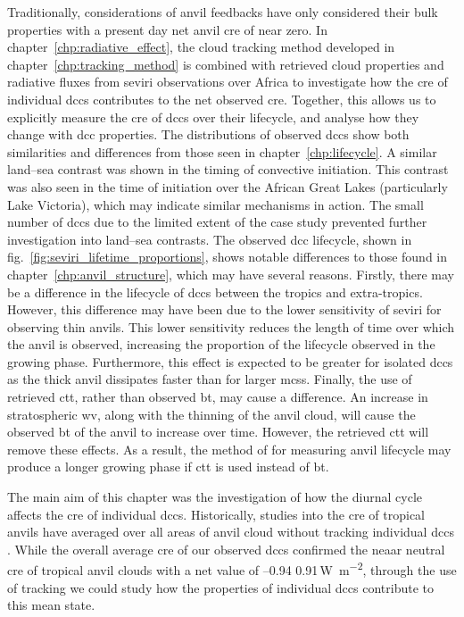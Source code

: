 Traditionally, considerations of anvil feedbacks have only considered their bulk properties with a present day net anvil \acrshort{cre} of near zero.
In chapter~\ref{chp:radiative_effect}, the cloud tracking method developed in chapter~\ref{chp:tracking_method} is combined with retrieved cloud properties and radiative fluxes from \acrshort{seviri} observations over Africa to investigate how the \acrshort{cre} of individual \acrshort{dcc}s contributes to the net observed \acrshort{cre}. 
Together, this allows us to explicitly measure the \acrshort{cre} of \acrshort{dcc}s over their lifecycle, and analyse how they change with \acrshort{dcc} properties.
The distributions of observed \acrshort{dcc}s show both similarities and differences from those seen in chapter~\ref{chp:lifecycle}.
A similar land--sea contrast was shown in the timing of convective initiation.
This contrast was also seen in the time of initiation over the African Great Lakes (particularly Lake Victoria), which may indicate similar mechanisms in action.
The small number of \acrshort{dcc}s due to the limited extent of the case study prevented further investigation into land--sea contrasts.
The observed \acrshort{dcc} lifecycle, shown in fig.~\ref{fig:seviri_lifetime_proportions}, shows notable differences to those found in chapter~\ref{chp:anvil_structure}, which may have several reasons.
Firstly, there may be a difference in the lifecycle of \acrshort{dcc}s between the tropics and extra-tropics.
However, this difference may have been due to the lower sensitivity of \acrshort{seviri} for observing thin anvils.
This lower sensitivity reduces the length of time over which the anvil is observed, increasing the proportion of the lifecycle observed in the growing phase.
Furthermore, this effect is expected to be greater for isolated \acrshort{dcc}s as the thick anvil dissipates faster than for larger \acrshort{mcs}s.
Finally, the use of retrieved \acrshort{ctt}, rather than observed \acrshort{bt}, may cause a difference.
An increase in stratospheric \acrshort{wv}, along with the thinning of the anvil cloud, will cause the observed \acrshort{bt} of the anvil to increase over time.
However, the retrieved \acrshort{ctt} will remove these effects.
As a result, the method of \citet{futyan_deep_2007} for measuring anvil lifecycle may produce a longer growing phase if \acrshort{ctt} is used instead of \acrshort{bt}.

The main aim of this chapter was the investigation of how the diurnal cycle affects the \acrshort{cre} of individual \acrshort{dcc}s.
Historically, studies into the \acrshort{cre} of tropical anvils have averaged over all areas of anvil cloud without tracking individual \acrshort{dcc}s \citep{ramanathan_cloud-radiative_1989, hartmann_effect_1992, stephens_cloudsat_2018}.
While the overall average \acrshort{cre} of our observed \acrshort{dcc}s confirmed the neaar neutral \acrshort{cre} of tropical anvil clouds with a net value of --0.94\,\textpm\,0.91\,\unit{W m^{-2}}, through the use of tracking we could study how the properties of individual \acrshort{dcc}s contribute to this mean state.

